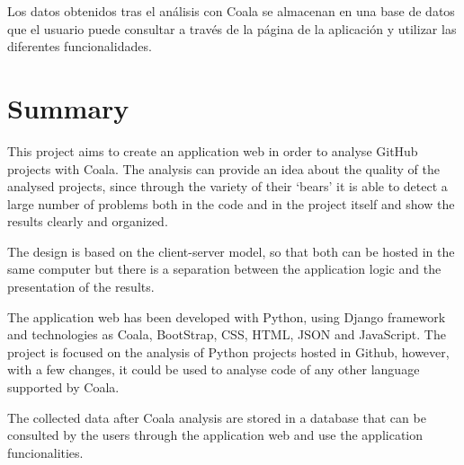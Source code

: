 \documentclass[a4paper, 12pt]{book}
\begin{document}
Los datos obtenidos tras el análisis con Coala se almacenan en una base de datos que el usuario
puede consultar a través de la página de la aplicación y utilizar las diferentes funcionalidades.

\chapter*{Summary}

This project aims to create an application web in order to analyse GitHub projects with Coala. The analysis can provide an idea about the quality of the analysed projects, since through the variety of their `bears' it is able to detect a large number of problems both in the code and in the project itself and show the results clearly and organized.

The design is based on the client-server model, so that both can be hosted in the same computer but there is a separation between the application logic and the presentation of the results.

The application web has been developed with Python, using Django framework and technologies as Coala, BootStrap, CSS, HTML, JSON and JavaScript. The project is focused on the analysis of Python projects hosted in Github, however, with a few changes, it could be used to analyse code of any other language supported by Coala.

The collected data after Coala analysis are stored in a database that can be consulted by the users through the application web and use the application funcionalities.



\tableofcontents 
\cleardoublepage
\listoffigures %
\end{document}
